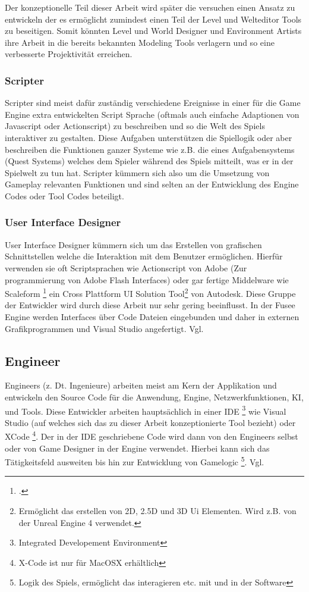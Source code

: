 \documentclass[pagesize, paper=a4, fontsize=12pt, titlepage=true, headings=small, headnosepline, abstractoff, liststotoc, nochapterprefix, plainheadsepline, twoside]{scrreprt}
\begin{document}
Der konzeptionelle Teil dieser Arbeit wird später die versuchen einen Ansatz zu entwickeln der es ermöglicht zumindest einen Teil der Level und Welteditor Tools zu beseitigen. Somit könnten Level und World Designer und Environment Artists ihre Arbeit in die bereits bekannten Modeling Tools verlagern und so eine verbesserte Projektivität erreichen.

\subsubsection{Scripter}
Scripter sind meist dafür zuständig verschiedene Ereignisse in einer für die Game Engine extra entwickelten Script Sprache (oftmals auch einfache Adaptionen von Javascript oder Actionscript) zu beschreiben und so die Welt des Spiels interaktiver zu gestalten. Diese Aufgaben unterstützen die Spiellogik oder aber beschreiben die Funktionen ganzer Systeme wie z.B. die eines Aufgabensystems (Quest Systems) welches dem Spieler während des Spiels mitteilt, was er in der Spielwelt zu tun hat. Scripter kümmern sich also um die Umsetzung von Gameplay relevanten Funktionen und sind selten an der Entwicklung des Engine Codes oder Tool Codes beteiligt.

\subsubsection{User Interface Designer}
User Interface Designer kümmern sich um das Erstellen von grafischen Schnittstellen welche die Interaktion mit dem Benutzer ermöglichen. Hierfür verwenden sie oft Scriptsprachen wie Actionscript von Adobe (Zur programmierung von Adobe Flash Interfaces) oder gar fertige Middelware wie Scaleform \footcite{AutodeskScale2014} ein Cross Plattform UI Solution Tool\footnote{Ermöglicht das erstellen von 2D, 2.5D und 3D Ui Elementen. Wird z.B. von der Unreal Engine 4 verwendet.} von Autodesk. Diese Gruppe der Entwickler wird durch diese Arbeit nur sehr gering beeinflusst. In der Fusee Engine werden Interfaces über Code Dateien eingebunden und daher in externen Grafikprogrammen und Visual Studio angefertigt. Vgl. \autocite[S. 31]{Chandler2006}

\subsection{Engineer}
Engineers (z. Dt. Ingenieure) arbeiten meist am Kern der Applikation und entwickeln den Source Code für die Anwendung, Engine, Netzwerkfunktionen, KI, und Tools. Diese Entwickler arbeiten hauptsächlich in einer IDE \footnote{Integrated Developement Environment} wie Visual Studio (auf welches sich das zu dieser Arbeit konzeptionierte Tool bezieht) oder XCode \footnote{X-Code ist nur für MacOSX erhältlich}. Der in der IDE geschriebene Code wird dann von den Engineers selbst oder von Game Designer in der Engine verwendet. Hierbei kann sich das Tätigkeitsfeld ausweiten bis hin zur Entwicklung von Gamelogic \footnote{Logik des Spiels, ermöglicht das interagieren etc. mit und in der Software}. Vgl. \autocite[S. 26]{Chandler2006}
\end{document}
